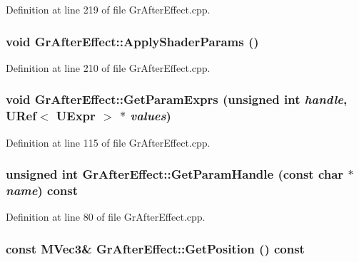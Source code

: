 Definition at line 219 of file GrAfterEffect.cpp.\hypertarget{class_gr_after_effect_2fddc6ab0ea8bceb23704adfe6c1449c}{
\subsubsection[{ApplyShaderParams}]{\setlength{\rightskip}{0pt plus 5cm}void GrAfterEffect::ApplyShaderParams ()}}
\label{class_gr_after_effect_2fddc6ab0ea8bceb23704adfe6c1449c}




Definition at line 210 of file GrAfterEffect.cpp.\hypertarget{class_gr_after_effect_ee972346c19d4fbac65ac837bb213ae0}{
\subsubsection[{GetParamExprs}]{\setlength{\rightskip}{0pt plus 5cm}void GrAfterEffect::GetParamExprs (unsigned int {\em handle}, \/  {\bf URef}$<$ {\bf UExpr} $>$ $\ast$ {\em values})}}
\label{class_gr_after_effect_ee972346c19d4fbac65ac837bb213ae0}




Definition at line 115 of file GrAfterEffect.cpp.\hypertarget{class_gr_after_effect_079dd4c9fb631908bf9b2d133c733280}{
\subsubsection[{GetParamHandle}]{\setlength{\rightskip}{0pt plus 5cm}unsigned int GrAfterEffect::GetParamHandle (const char $\ast$ {\em name}) const}}
\label{class_gr_after_effect_079dd4c9fb631908bf9b2d133c733280}




Definition at line 80 of file GrAfterEffect.cpp.\hypertarget{class_gr_after_effect_d79a8c6ea1f445e34889587d205e5b55}{
\subsubsection[{GetPosition}]{\setlength{\rightskip}{0pt plus 5cm}const {\bf MVec3}\& GrAfterEffect::GetPosition () const}}
\label{class_gr_after_effect_d79a8c6ea1f445e34889587d205e5b55}




